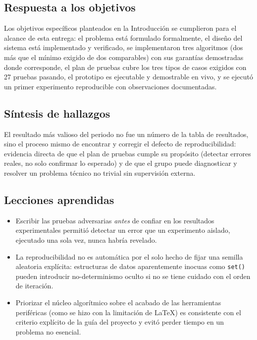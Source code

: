 \documentclass[11pt,a4paper]{article}
\begin{document}
\subsection{Respuesta a los objetivos}
Los objetivos específicos planteados en la Introducción se cumplieron para el alcance de
esta entrega: el problema está formulado formalmente, el diseño del sistema está
implementado y verificado, se implementaron tres algoritmos (dos más que el mínimo exigido
de dos comparables) con sus garantías demostradas donde corresponde, el plan de pruebas
cubre los tres tipos de casos exigidos con 27 pruebas pasando, el prototipo es ejecutable y
demostrable en vivo, y se ejecutó un primer experimento reproducible con observaciones
documentadas.

\subsection{Síntesis de hallazgos}
El resultado más valioso del periodo no fue un número de la tabla de resultados, sino el
proceso mismo de encontrar y corregir el defecto de reproducibilidad: evidencia directa de
que el plan de pruebas cumple su propósito (detectar errores reales, no solo confirmar lo
esperado) y de que el grupo puede diagnosticar y resolver un problema técnico no trivial sin
supervisión externa.

\subsection{Lecciones aprendidas}
\begin{itemize}
	\item Escribir las pruebas adversarias \emph{antes} de confiar en los resultados
	experimentales permitió detectar un error que un experimento aislado, ejecutado una sola
	vez, nunca habría revelado.
	\item La reproducibilidad no es automática por el solo hecho de fijar una semilla
	aleatoria explícita: estructuras de datos aparentemente inocuas como \texttt{set()}
	pueden introducir no-determinismo oculto si no se tiene cuidado con el orden de
	iteración.
	\item Priorizar el núcleo algorítmico sobre el acabado de las herramientas periféricas
	(como se hizo con la limitación de \LaTeX{}) es consistente con el criterio explícito de
	la guía del proyecto y evitó perder tiempo en un problema no esencial.
\end{itemize}
\end{document}
